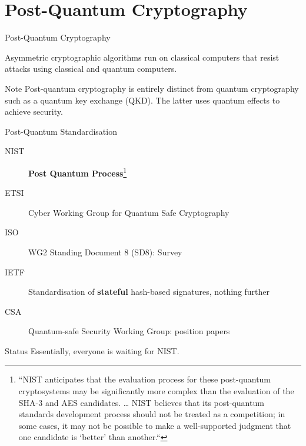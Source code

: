 \documentclass[xcolor=table,10pt,aspectratio=169]{beamer}
\begin{document}
\section{Post-Quantum Cryptography}
\label{sec:org4e51d49}
\begin{frame}[label={sec:org89ed6e9}]{Post-Quantum Cryptography}
\begin{definition}
Asymmetric cryptographic algorithms run on classical computers that resist attacks using classical and quantum computers.
\end{definition}

\pause

\begin{alertblock}{Note}
Post-quantum cryptography is entirely distinct from quantum cryptography such as a quantum key exchange (QKD). The latter uses quantum effects to achieve security.
\end{alertblock}
\end{frame}

\begin{frame}[label={sec:orgc6e6eee}]{Post-Quantum Standardisation}
\begin{description}
\item[{NIST}] \textbf{Post Quantum {\color{lightgray}{Competition} }Process}\footnote{“NIST anticipates that the evaluation process for these post-quantum cryptosystems may be significantly more complex than the evaluation of the SHA-3 and AES candidates. … NIST believes that its post-quantum standards development process should not be treated as a competition; in some cases, it may not be possible to make a well-supported judgment that one candidate is ‘better’ than another.“}
\item[{ETSI}] Cyber Working Group for Quantum Safe Cryptography
\item[{ISO}] WG2 Standing Document 8 (SD8): Survey
\item[{IETF}] Standardisation of \textbf{stateful} hash-based signatures, nothing further
\item[{CSA}] Quantum-safe Security Working Group: position papers
\end{description}

\pause

\begin{alertblock}{Status}
Essentially, everyone is waiting for NIST.
\end{alertblock}
\end{frame}
\end{document}
